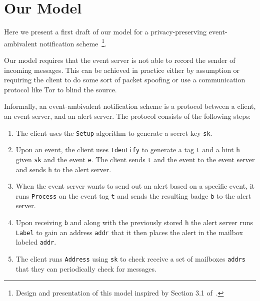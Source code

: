 \section{Our Model}

Here we present a first draft of our model for a privacy-preserving
event-ambivalent notification scheme~\footnote{Design and presentation of this
model inspired by Section 3.1 of~\cite{CK:eurocrypt20}.}.\par

Our model requires that the event server is not able to record the sender of
incoming messages. This can be achieved in practice either by assumption or
requiring the client to do some sort of packet spoofing or use a communication
protocol like Tor to blind the source.

Informally, an event-ambivalent notification scheme is a protocol between a
client, an event server, and an alert server. The protocol consists of the
following steps:\par

\begin{enumerate}
  \item The client uses the \texttt{Setup} algorithm to generate a secret key
    \texttt{sk}.
  \item Upon an event, the client uses \texttt{Identify} to generate a
    tag \texttt{t} and a hint \texttt{h} given \texttt{sk} and the event
    \texttt{e}. The client sends \texttt{t} and the event to the event
    server and sends \texttt{h} to the alert server.
  \item When the event server wants to send out an alert based on a specific
    event, it runs \texttt{Process} on the event tag \texttt{t} and sends the 
    resulting badge \texttt{b} to the alert server.
  \item Upon receiving \texttt{b} and along with the previously stored
    \texttt{h} the alert server runs \texttt{Label} to gain an address
    \texttt{addr} that it then places the alert in the mailbox labeled
    \texttt{addr}.
  \item The client runs \texttt{Address} using \texttt{sk} to check receive a
    set of mailboxes \texttt{addrs} that they can periodically check for
    messages.
\end{enumerate}

